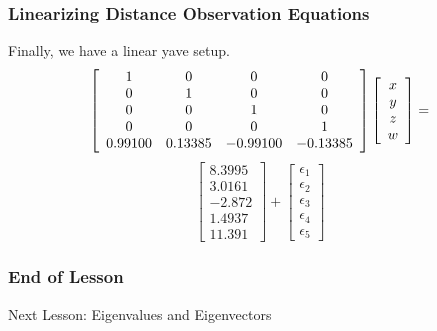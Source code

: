\documentclass[xcolor=dvipsnames]{beamer}
\begin{document}
\begin{frame}
  \frametitle{Linearizing Distance Observation Equations}
  Finally, we have a linear yave setup.
  \begin{equation}
    \label{eq:hohchadu}
    \left[
      \begin{array}{cccc}
        1&0&0&0 \\
        0&1&0&0 \\
        0&0&1&0 \\
        0&0&0&1 \\
        0.99100&0.13385&-0.99100&-0.13385
      \end{array}\right]\left[
      \begin{array}{c}
        x \\
        y \\
        z \\
        w
      \end{array}\right]=\notag
  \end{equation}
  \begin{equation}
    \label{eq:yaericee}
    \left[
      \begin{array}{c}
8.3995 \\
3.0161 \\
-2.872 \\
        1.4937 \\
        11.391
      \end{array}\right]+\left[
      \begin{array}{c}
      \epsilon_{1} \\
      \epsilon_{2} \\
      \epsilon_{3} \\
      \epsilon_{4} \\
      \epsilon_{5}
    \end{array}\right]
  \end{equation}
\end{frame}

\begin{frame}
  \frametitle{End of Lesson}
Next Lesson: Eigenvalues and Eigenvectors
\end{frame}
\end{document}
